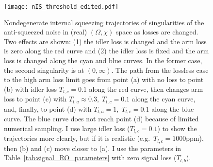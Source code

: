 \begin{figure}[ht!]
    \centering
    \texttt{[image: nIS\_threshold\_edited.pdf]}
    \caption{Nondegenerate internal squeezing trajectories of singularities of the anti-squeezed noise in (real) $(\Omega, \chi)$ space as losses are changed. Two effects are shown: (1) the idler loss is changed and the arm loss is zero along the red curve and (2) the idler loss is fixed and the arm loss is changed along the cyan and blue curves. In the former case, the second singularity is at $(0,\infty)$.
    The path from the lossless case to the high arm loss limit goes from point (a) with no loss to point (b) with idler loss $T_{l,c}=0.1$ along the red curve, then changes arm loss to point (c) with $T_{l,a}\approx0.3,\;T_{l,c}=0.1$ along the cyan curve, and, finally, to point (d) with $T_{l,a}=1,\;T_{l,c}=0.1$ along the blue curve. The blue curve does not reach point (d) because of limited numerical sampling.
    I use large idler loss ($T_{l,c}=0.1$) to show the trajectories more clearly, but if it is realistic (e.g.\ $T_{l,c}=1000\text{ppm}$), then (b) and (c) move closer to (a). I use the parameters in Table~\ref{tab:signal_RO_parameters} with zero signal loss ($T_{l,b}$).}
    \label{fig:nIS_threshold_traj}
\end{figure}

